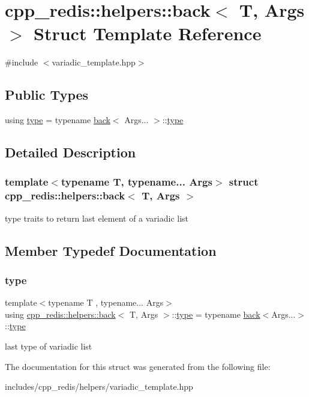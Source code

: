\hypertarget{structcpp__redis_1_1helpers_1_1back}{}\section{cpp\+\_\+redis\+:\+:helpers\+:\+:back$<$ T, Args $>$ Struct Template Reference}
\label{structcpp__redis_1_1helpers_1_1back}


{\ttfamily \#include $<$variadic\+\_\+template.\+hpp$>$}

\subsection*{Public Types}
\begin{DoxyCompactItemize}
\item 
using \hyperlink{structcpp__redis_1_1helpers_1_1back_a83f1d0c03ffc82ff8ab7243c3c858195}{type} = typename \hyperlink{structcpp__redis_1_1helpers_1_1back}{back}$<$ Args... $>$\+::\hyperlink{structcpp__redis_1_1helpers_1_1back_a83f1d0c03ffc82ff8ab7243c3c858195}{type}
\end{DoxyCompactItemize}


\subsection{Detailed Description}
\subsubsection*{template$<$typename T, typename... Args$>$\newline
struct cpp\+\_\+redis\+::helpers\+::back$<$ T, Args $>$}

type traits to return last element of a variadic list 

\subsection{Member Typedef Documentation}
\mbox{\label{structcpp__redis_1_1helpers_1_1back_a83f1d0c03ffc82ff8ab7243c3c858195}} 
\subsubsection{\texorpdfstring{type}{type}}
{\footnotesize\ttfamily template$<$typename T , typename... Args$>$ \\
using \hyperlink{structcpp__redis_1_1helpers_1_1back}{cpp\+\_\+redis\+::helpers\+::back}$<$ T, Args $>$\+::\hyperlink{structcpp__redis_1_1helpers_1_1back_a83f1d0c03ffc82ff8ab7243c3c858195}{type} =  typename \hyperlink{structcpp__redis_1_1helpers_1_1back}{back}$<$Args...$>$\+::\hyperlink{structcpp__redis_1_1helpers_1_1back_a83f1d0c03ffc82ff8ab7243c3c858195}{type}}

last type of variadic list 

The documentation for this struct was generated from the following file\+:\begin{DoxyCompactItemize}
\item 
includes/cpp\+\_\+redis/helpers/variadic\+\_\+template.\+hpp\end{DoxyCompactItemize}
